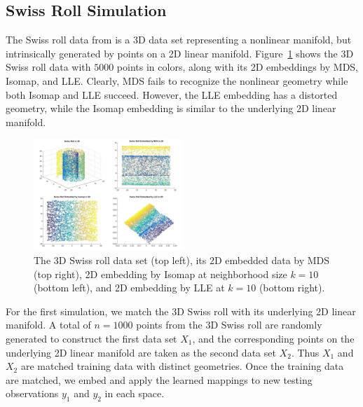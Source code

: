 \documentclass[times,twocolumn,final]{elsarticle}
\begin{document}
\subsection{Swiss Roll Simulation}
The Swiss roll data from \citep{TenenbaumSilvaLangford2000} is a 3D data set representing a nonlinear manifold, but intrinsically generated by points on a 2D linear manifold. Figure~\ref{fig1} shows the 3D Swiss roll data with $5000$ points in colors, along with its 2D embeddings by MDS, Isomap, and LLE. Clearly, MDS fails to recognize the nonlinear geometry while both Isomap and LLE succeed. However, the LLE embedding has a distorted geometry, while the Isomap embedding is similar to the underlying 2D linear manifold.

\begin{figure}[htbp]
\centering
\includegraphics[width=0.5\textwidth]{../Figures/Swiss}
\caption{The 3D Swiss roll data set (top left), its 2D embedded data by MDS (top right), 2D embedding by Isomap at neighborhood size $k=10$ (bottom left), and 2D embedding by LLE at $k=10$ (bottom right).}
\label{fig1}
\end{figure}

For the first simulation, we match the 3D Swiss roll with its underlying 2D linear manifold. A total of $n=1000$ points from the 3D Swiss roll are randomly generated to construct the first data set $X_{1}$, and the corresponding points on the underlying 2D linear manifold are taken as the second data set $X_{2}$. Thus $X_{1}$ and $X_{2}$ are matched training data with distinct geometries. Once the training data are matched, we embed and apply the learned mappings to new testing observations $y_{1}$ and $y_{2}$ in each space.
%
%
%
%
%
%
%
%
%
\end{document}
